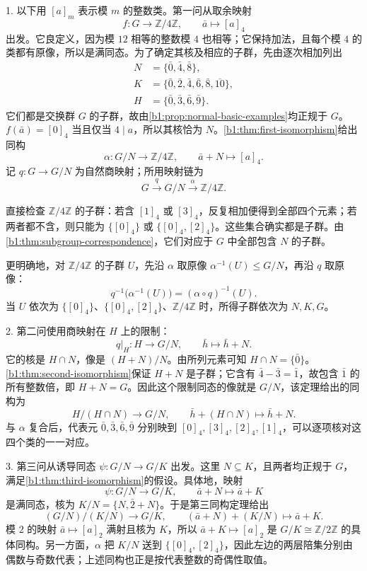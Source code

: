 \begin{solution}
	1. 以下用 \([a]_m\) 表示模 \(m\) 的整数类。第一问从取余映射
	\[
		f:G\longrightarrow\mathbb Z/4\mathbb Z,\qquad \bar a\longmapsto[a]_4
	\]
	出发。它良定义，因为模 \(12\) 相等的整数模 \(4\) 也相等；它保持加法，且每个模 \(4\) 的类都有原像，所以是满同态。为了确定其核及相应的子群，先由逐次相加列出
	\[
		\begin{aligned}
			N&=\{\bar0,\bar4,\bar8\},\\
			K&=\{\bar0,\bar2,\bar4,\bar6,\bar8,\overline{10}\},\\
			H&=\{\bar0,\bar3,\bar6,\bar9\}.
		\end{aligned}
	\]
	它们都是交换群 \(G\) 的子群，故由\cref{b1:prop:normal-basic-examples}均正规于 \(G\)。\(f(\bar a)=[0]_4\) 当且仅当 \(4\mid a\)，所以其核恰为 \(N\)。\cref{b1:thm:first-isomorphism}给出同构
	\[
		\alpha:G/N\longrightarrow\mathbb Z/4\mathbb Z,\qquad \bar a+N\longmapsto[a]_4.
	\]
	记 \(q:G\rightarrow G/N\) 为自然商映射；所用映射链为
	\[
		G\xrightarrow{q}G/N\xrightarrow{\alpha}\mathbb Z/4\mathbb Z.
	\]

	直接检查 \(\mathbb Z/4\mathbb Z\) 的子群：若含 \([1]_4\) 或 \([3]_4\)，反复相加便得到全部四个元素；若两者都不含，则只能为 \(\bigl\{[0]_4\bigr\}\) 或 \(\bigl\{[0]_4,[2]_4\bigr\}\)。这些集合确实都是子群。由\cref{b1:thm:subgroup-correspondence}，它们对应于 \(G\) 中全部包含 \(N\) 的子群。

	更明确地，对 \(\mathbb Z/4\mathbb Z\) 的子群 \(U\)，先沿 \(\alpha\) 取原像 \(\alpha^{-1}(U)\leq G/N\)，再沿 \(q\) 取原像：
	\[
		q^{-1}\bigl(\alpha^{-1}(U)\bigr) =(\alpha\circ q)^{-1}(U).
	\]
	当 \(U\) 依次为 \(\{[0]_4\}\)、\(\{[0]_4,[2]_4\}\)、\(\mathbb Z/4\mathbb Z\) 时，所得子群依次为 \(N,K,G\)。

	2. 第二问使用商映射在 \(H\) 上的限制：
	\[
		q|_H:H\longrightarrow G/N,\qquad \bar h\longmapsto\bar h+N.
	\]
	它的核是 \(H\cap N\)，像是 \((H+N)/N\)。由所列元素可知 \(H\cap N=\{\bar0\}\)。\cref{b1:thm:second-isomorphism}保证 \(H+N\) 是子群；它含有 \(\bar4-\bar3=\bar1\)，故包含 \(\bar1\) 的所有整数倍，即 \(H+N=G\)。因此这个限制同态的像就是 \(G/N\)，该定理给出的同构为
	\[
		H/(H\cap N)\longrightarrow G/N,\qquad \bar h+(H\cap N)\longmapsto\bar h+N.
	\]
	与 \(\alpha\) 复合后，代表元 \(\bar0,\bar3,\bar6,\bar9\) 分别映到 \([0]_4,[3]_4,[2]_4,[1]_4\)，可以逐项核对这四个类的一一对应。

	3. 第三问从诱导同态 \(\psi:G/N\rightarrow G/K\) 出发。这里 \(N\subseteq K\)，且两者均正规于 \(G\)，满足\cref{b1:thm:third-isomorphism}的假设。具体地，映射
	\[
		\psi:G/N\longrightarrow G/K,\qquad \bar a+N\longmapsto\bar a+K
	\]
	是满同态，核为 \(K/N=\{N,\bar2+N\}\)。于是第三同构定理给出
	\[
		(G/N)/(K/N)\longrightarrow G/K,\qquad (\bar a+N)+(K/N)\longmapsto\bar a+K.
	\]
	模 \(2\) 的映射 \(\bar a\mapsto[a]_2\) 满射且核为 \(K\)，所以 \(\bar a+K\mapsto[a]_2\) 是 \(G/K\cong\mathbb Z/2\mathbb Z\) 的具体同构。另一方面，\(\alpha\) 把 \(K/N\) 送到 \(\bigl\{[0]_4,[2]_4\bigr\}\)，因此左边的两层陪集分别由偶数与奇数代表；上述同构也正是按代表整数的奇偶性取值。
\end{solution}

